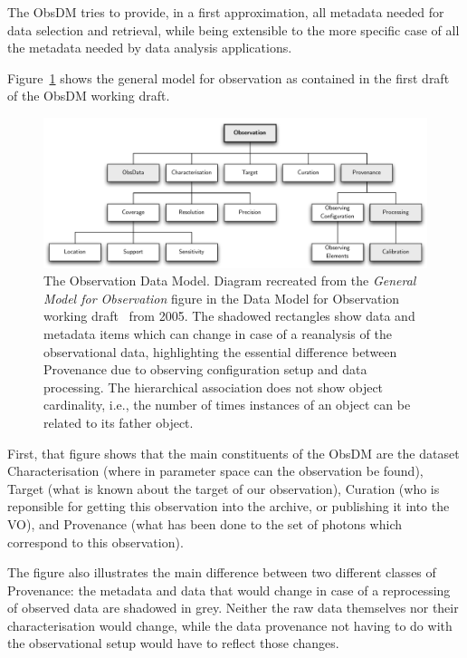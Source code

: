 			 The ObsDM tries to provide, in a first approximation,
			all metadata needed for data selection and retrieval,
			while being extensible to the more specific case of all
			the metadata needed by data analysis applications.
			
			 Figure~\ref{fig:fig_ObservationDM} shows the general
			model for observation as contained in the first draft
			of the ObsDM working draft.
			
			\begin{figure}[tbp]
				\centering
					\includegraphics[width=\columnwidth]
					{fig/ObservationDM.pdf}
				\caption[The Observation Data Model]
				{
					 The Observation Data Model. Diagram recreated
					from the \emph{General Model for Observation}
					figure in the Data Model for Observation
					working draft~\cite{2005dmo..rept.....M} from
					2005. The shadowed rectangles show data and
					metadata items which can change in case of a
					reanalysis of the observational data,
					highlighting the essential difference between
					Provenance due to observing configuration setup
					and data processing. The hierarchical
					association does not show object
					cardinality, i.e., the number of times instances
					of an object can be related to its father
					object.
				}
				\label{fig:fig_ObservationDM}
			\end{figure}
			
			First, that figure shows that the main constituents
			of the ObsDM are the dataset Characterisation (where
			in parameter space can the observation be found),
			Target (what is known about the
			target of our observation), Curation (who is reponsible
			for getting this observation into the archive, or
			publishing it into the VO), and Provenance (what has
			been done to the set of photons which correspond to this
			observation).
			
			 The figure also illustrates the main difference between
			two different classes of Provenance: the metadata and
			data that would change in case of a reprocessing of 
			observed data are shadowed in grey. Neither the raw data
			themselves nor their characterisation would change,
			while the data provenance not having to do with the
			observational setup would have to reflect those changes.
			
